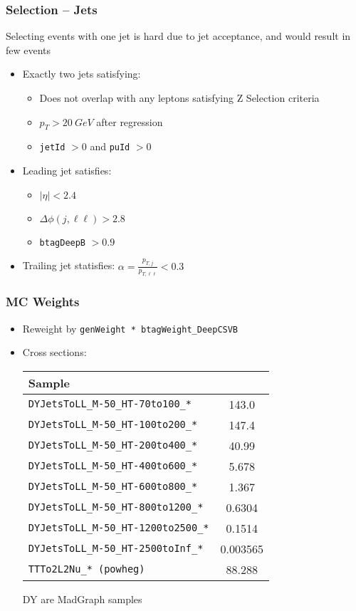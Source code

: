 \documentclass{beamer}
\begin{document}
\begin{frame}
  \frametitle{Selection -- Jets}

  Selecting events with one jet is hard due to jet acceptance,
  and would result in few events

  \vfill

  \begin{itemize}
  \item Exactly two jets satisfying:
    \begin{itemize}
    \item Does not overlap with any leptons satisfying Z Selection criteria
    \item $p_T > \SI{20}{GeV}$ after regression
    \item \texttt{jetId} $> 0$ and \texttt{puId} $> 0$
    \end{itemize}
  \item Leading jet satisfies:
    \begin{itemize}
    \item $|\eta| < 2.4$
    \item $\Delta\phi(j, \ell\ell) > 2.8$
    \item \texttt{btagDeepB} $> 0.9$
    \end{itemize}
  \item Trailing jet statisfies: $\alpha = \frac{p_{T, j}}{p_{T, \ell\ell}} < 0.3$
  \end{itemize}

\end{frame}


\begin{frame}
  \frametitle{MC Weights}

  \begin{itemize}
  \item Reweight by \texttt{genWeight * btagWeight\_DeepCSVB}
  \item Cross sections:
    \vfill
    \begin{tabular}{|l|S|}
      \hline
      Sample &  \\
      \hline
      \texttt{DYJetsToLL\_M-50\_HT-70to100\_*} & 143.0 \\
      \texttt{DYJetsToLL\_M-50\_HT-100to200\_*} & 147.4 \\
      \texttt{DYJetsToLL\_M-50\_HT-200to400\_*} & 40.99 \\
      \texttt{DYJetsToLL\_M-50\_HT-400to600\_*} & 5.678 \\
      \texttt{DYJetsToLL\_M-50\_HT-600to800\_*} & 1.367 \\
      \texttt{DYJetsToLL\_M-50\_HT-800to1200\_*} & 0.6304 \\
      \texttt{DYJetsToLL\_M-50\_HT-1200to2500\_*} & 0.1514 \\
      \texttt{DYJetsToLL\_M-50\_HT-2500toInf\_*} & 0.003565 \\
      \texttt{TTTo2L2Nu\_* (powheg)} & 88.288 \\
      \hline
    \end{tabular}
    \vfill
    DY are MadGraph samples
  \end{itemize}

\end{frame}
\end{document}
